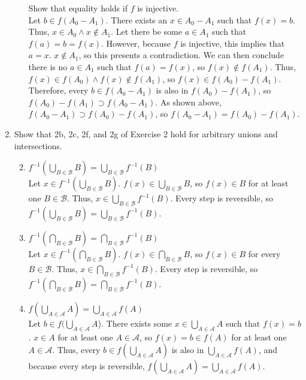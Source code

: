 \documentclass{article}
\begin{document}
\begin{enumerate}
\begin{enumerate}
                        Show that equality holds if $f$ is injective.\\
                        Let $b \in f(A_{0} - A_{1})$. There exists an $x \in A_{0} - A_{1}$ such that $f(x) = b$. Thus, $x \in A_{0} \land x \notin A_{1}$. Let there be some $a \in A_{1}$ such that $f(a) = b = f(x)$. However, because $f$ is injective, this implies that $a = x$. $x \notin A_{1}$, so this presents a contradiction. We can then conclude there is no $a \in A_{1}$ such that $f(a) = f(x)$, so $f(x) \notin f(A_{1})$. Thus, $f(x) \in f(A_{0}) \land f(x) \notin f(A_{1})$, so $f(x) \in f(A_{0}) - f(A_{1})$. Therefore, every $b \in f(A_{0} - A_{1})$ is also in $f(A_{0}) - f(A_{1})$, so $f(A_{0}) - f(A_{1}) \supset f(A_{0} - A_{1})$. As shown above, $f(A_{0} - A_{1}) \supset f(A_{0}) - f(A_{1})$, so $f(A_{0} - A_{1}) = f(A_{0}) - f(A_{1})$.
            \end{enumerate}
      \item Show that 2b, 2c, 2f, and 2g of Exercise 2 hold for arbitrary unions and intersections.
            \begin{enumerate}
                  \setcounter{enumii}{1}
                  \item $f^{-1}(\bigcup_{B \in \mathcal{B}} B) = \bigcup_{B \in \mathcal{B}} f^{-1}(B)$\\
                        Let $x \in f^{-1}(\bigcup_{B \in \mathcal{B}} B)$. $f(x) \in \bigcup_{B \in \mathcal{B}} B$, so $f(x) \in B$ for at least one $B \in \mathcal{B}$. Thus, $x \in \bigcup_{B \in \mathcal{B}} f^{-1}(B)$. Every step is reversible, so $f^{-1}(\bigcup_{B \in \mathcal{B}} B) = \bigcup_{B \in \mathcal{B}} f^{-1}(B)$.
                  \item $f^{-1}(\bigcap_{B \in \mathcal{B}} B) = \bigcap_{B \in \mathcal{B}} f^{-1}(B)$\\
                        Let $x \in f^{-1}(\bigcap_{B \in \mathcal{B}} B)$. $f(x) \in \bigcap_{B \in \mathcal{B}} B$, so $f(x) \in B$ for every $B \in \mathcal{B}$. Thus, $x \in \bigcap_{B \in \mathcal{B}} f^{-1}(B)$. Every step is reversible, so $f^{-1}(\bigcap_{B \in \mathcal{B}} B) = \bigcap_{B \in \mathcal{B}} f^{-1}(B)$.
                  \setcounter{enumii}{5}
                  \item $f(\bigcup_{A \in \mathcal{A}} A) = \bigcup_{A \in \mathcal{A}} f(A)$\\
                        Let $b \in f(\bigcup_{A \in \mathcal{A}} A$). There exists some $x \in \bigcup_{A \in \mathcal{A}} A$ such that $f(x) = b$. $x \in A$ for at least one $A \in \mathcal{A}$, so $f(x) = b \in f(A)$ for at least one $A \in \mathcal{A}$. Thus, every $b \in f(\bigcup_{A \in \mathcal{A}} A)$ is also in $\bigcup_{A \in \mathcal{A}} f(A)$, and because every step is reversible, $f(\bigcup_{A \in \mathcal{A}} A) = \bigcup_{A \in \mathcal{A}} f(A)$.

\end{enumerate}
\end{enumerate}
\end{document}
